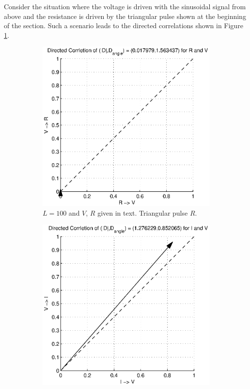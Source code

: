 \documentclass[a4paper,11pt]{article}
\begin{document}
Consider the situation where the voltage is driven with the sinusoidal signal from above and the resistance is driven by the triangular pulse shown at the beginning of the section.  Such a scenario leads to the directed correlations shown in Figure \ref{fig:RL_RTriVsinCCMVR}.
\begin{figure}[h!t]
\centering
\begin{subfigure}[b]{0.25\textwidth}
\label{fig:RL_RTriVsinCCMVR}
\includegraphics[scale=0.4]{graphics/RL_RTriVsinCCMVR.eps}
\caption{$L = 100$ and $V$, $R$ given in text. Triangular pulse $R$.}
\end{subfigure}
\begin{subfigure}[b]{0.25\textwidth}
\label{fig:RL_RTriVsinCCMVI}
\includegraphics[scale=0.4]{graphics/RL_RTriVsinCCMVI.eps}

\end{subfigure}
\end{figure}
\end{document}
